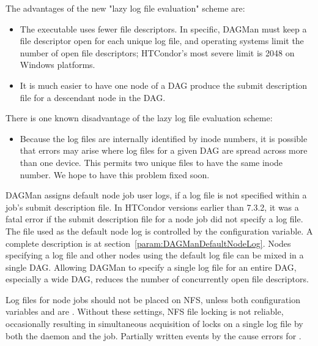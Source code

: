 The advantages of the new "lazy log file evaluation" scheme are:

\begin{itemize}

\item The  executable uses fewer file descriptors.
In specific,
DAGMan must keep a file descriptor open for each unique log file,
and operating systems limit the number of open file descriptors;
HTCondor's most severe limit is 2048 on Windows platforms.

\item It is much easier to have one node of a DAG produce the
submit description file for a descendant node in the DAG.

\end{itemize}

There is one known disadvantage of the lazy log file evaluation scheme:

\begin{itemize}

\item Because the log files are internally identified by inode
numbers, it is possible that errors may arise where log files for
a given DAG are spread across more than one device.
This permits two unique files to have the same inode number.
We hope to have this problem fixed soon.

\end{itemize}

DAGMan assigns 
default node job user logs,
if a log file is not specified within a job's submit description file.
In HTCondor versions earlier than 7.3.2, 
it was a fatal error if the submit description
file for a node job did not specify a log file.
The file used as the default node log is controlled by the
 configuration variable.
A complete description is at section~\ref{param:DAGManDefaultNodeLog}.
Nodes specifying a log file and other nodes using the default log
file can be mixed in a single DAG.
Allowing DAGMan to specify a single log file for an entire DAG, 
especially a wide DAG,
reduces the number of concurrently open file descriptors.

Log files for node jobs should not be placed on NFS, 
unless both configuration variables
 and 
are . 
Without these settings, NFS file locking is not reliable,
occasionally resulting in simultaneous acquisition of locks on a single
log file by both the  daemon and the  job. 
Partially written events by the  cause errors
for .

